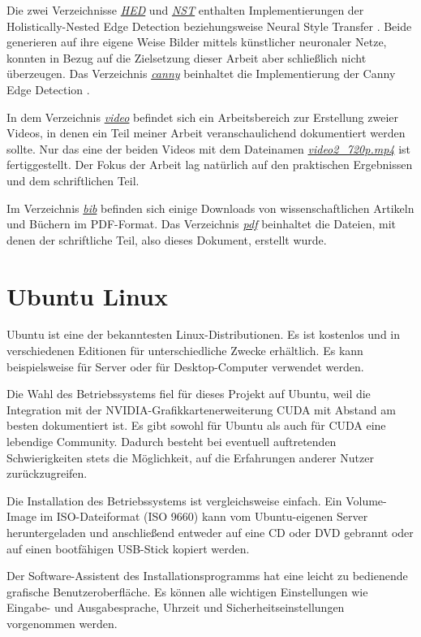 Die zwei Verzeichnisse \textit{\url{HED}} und \textit{\url{NST}} enthalten Implementierungen der Holistically-Nested Edge Detection\cite{xie2015hed} beziehungsweise Neural Style Transfer \cite{gatys2015nst}. Beide generieren auf ihre eigene Weise Bilder mittels künstlicher neuronaler Netze, konnten in Bezug auf die Zielsetzung dieser Arbeit aber schließlich nicht überzeugen. Das Verzeichnis \textit{\url{canny}} beinhaltet die Implementierung der Canny Edge Detection \cite{canny1986edge}.

In dem Verzeichnis \textit{\url{video}} befindet sich ein Arbeitsbereich zur Erstellung zweier Videos, in denen ein Teil meiner Arbeit veranschaulichend dokumentiert werden sollte. Nur das eine der beiden Videos mit dem Dateinamen \textit{\url{video2_720p.mp4}} ist fertiggestellt. Der Fokus der Arbeit lag natürlich auf den praktischen Ergebnissen und dem schriftlichen Teil.

Im Verzeichnis \textit{\url{bib}} befinden sich einige Downloads von wissenschaftlichen Artikeln und Büchern im PDF-Format. Das Verzeichnis \textit{\url{pdf}} beinhaltet die Dateien, mit denen der schriftliche Teil, also dieses Dokument, erstellt wurde.

\section{Ubuntu Linux}
\label{sec:ubuntu}
Ubuntu ist eine der bekanntesten Linux-Distributionen. Es ist kostenlos und in verschiedenen Editionen für unterschiedliche Zwecke erhältlich. Es kann beispielsweise für Server oder für Desktop-Computer verwendet werden.

Die Wahl des Betriebssystems fiel für dieses Projekt auf Ubuntu, weil die Integration mit der NVIDIA-Grafikkartenerweiterung CUDA mit Abstand am besten dokumentiert ist. Es gibt sowohl für Ubuntu als auch für CUDA eine lebendige Community. Dadurch besteht bei eventuell auftretenden Schwierigkeiten stets die Möglichkeit, auf die Erfahrungen anderer Nutzer zurückzugreifen.

Die Installation des Betriebssystems ist vergleichsweise einfach. Ein Volume-Image im ISO-Dateiformat (ISO 9660) kann vom Ubuntu-eigenen Server heruntergeladen und anschließend entweder auf eine CD oder DVD gebrannt oder auf einen bootfähigen USB-Stick kopiert werden.

Der Software-Assistent des Installationsprogramms hat eine leicht zu bedienende grafische Benutzeroberfläche. Es können alle wichtigen Einstellungen wie Eingabe- und Ausgabesprache, Uhrzeit und Sicherheitseinstellungen vorgenommen werden.

